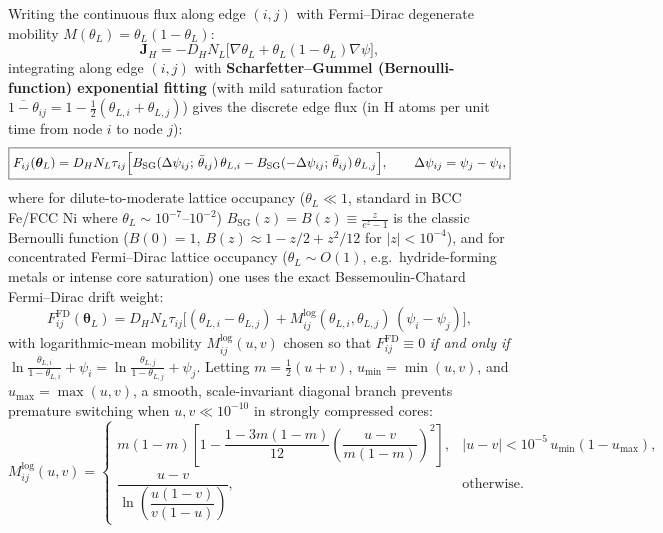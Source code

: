\documentclass[11pt,a4paper]{article}
\begin{document}
Writing the continuous flux along edge $(i,j)$ with Fermi--Dirac degenerate mobility $M(\theta_L) = \theta_L(1-\theta_L)$:
\begin{equation}
  \mathbf{J}_H = -D_H N_L \bigl[\nabla \theta_L + \theta_L(1-\theta_L)\nabla \psi\bigr],
  \label{eq:flux_fd}
\end{equation}
integrating along edge $(i,j)$ with \textbf{Scharfetter--Gummel (Bernoulli-function) exponential fitting} (with mild saturation factor $\overline{1-\theta}_{ij} = 1 - \frac{1}{2}(\theta_{L,i} + \theta_{L,j})$) gives the discrete edge flux (in H atoms per unit time from node $i$ to node $j$):
\begin{equation}
  \boxed{
  F_{ij}(\boldsymbol{\theta}_L)
  = D_H N_L \tau_{ij} \Bigl[
      B_{\text{SG}}(\Delta \psi_{ij};\, \bar{\theta}_{ij})\,\theta_{L,i}
    - B_{\text{SG}}(-\Delta \psi_{ij};\, \bar{\theta}_{ij})\,\theta_{L,j}
    \Bigr],
  \qquad \Delta \psi_{ij} = \psi_j - \psi_i,
  }
  \label{eq:sg_flux}
\end{equation}
where for dilute-to-moderate lattice occupancy ($\theta_L \ll 1$, standard in BCC Fe/FCC Ni where $\theta_L \sim 10^{-7}\text{--}10^{-2}$) $B_{\text{SG}}(z) = B(z) \equiv \frac{z}{e^z - 1}$ is the classic Bernoulli function ($B(0)=1$, $B(z) \approx 1 - z/2 + z^2/12$ for $|z| < 10^{-4}$), and for concentrated Fermi--Dirac lattice occupancy ($\theta_L \sim O(1)$, e.g.\ hydride-forming metals or intense core saturation) one uses the exact Bessemoulin-Chatard Fermi--Dirac drift weight:
\begin{equation}
  F_{ij}^{\text{FD}}(\boldsymbol{\theta}_L)
  = D_H N_L \tau_{ij} \Biggl[
      (\theta_{L,i} - \theta_{L,j})
      + M_{ij}^{\text{log}}(\theta_{L,i}, \theta_{L,j})\,(\psi_i - \psi_j)
    \Biggr],
  \label{eq:fd_log_mean}
\end{equation}
with logarithmic-mean mobility $M_{ij}^{\text{log}}(u, v)$ chosen so that $F_{ij}^{\text{FD}} \equiv 0$ \emph{if and only if} $\ln\frac{\theta_{L,i}}{1-\theta_{L,i}} + \psi_i = \ln\frac{\theta_{L,j}}{1-\theta_{L,j}} + \psi_j$. Letting $m = \frac{1}{2}(u + v)$, $u_{\min} = \min(u, v)$, and $u_{\max} = \max(u, v)$, a smooth, scale-invariant diagonal branch prevents premature switching when $u, v \ll 10^{-10}$ in strongly compressed cores:
\begin{equation}
  M_{ij}^{\text{log}}(u, v) =
  \begin{cases}
    m(1-m)\!\left[1 - \dfrac{1 - 3m(1-m)}{12}\left(\dfrac{u - v}{m(1-m)}\right)^2\right], & |u - v| < 10^{-5}\, u_{\min}(1 - u_{\max}), \\[8pt]
    \dfrac{u - v}{\ln\!\left(\dfrac{u(1-v)}{v(1-u)}\right)}, & \text{otherwise.}
  \end{cases}
  \label{eq:log_mean_mobility}
\end{equation}
\end{document}
